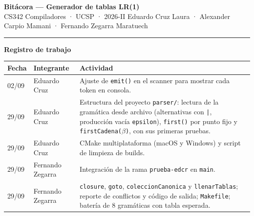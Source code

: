 \documentclass[10pt,a4paper]{article}
\begin{document}
{\Large\textbf{Bitácora --- Generador de tablas LR(1)}}\\[2pt]
CS342 Compiladores · UCSP · 2026-II\hfill
Eduardo Cruz Laura · Alexander Carpio Mamani · Fernando Zegarra Maratuech

\medskip
\hrule
\medskip

\textbf{Registro de trabajo}

\smallskip
{\small
\begin{tabularx}{\linewidth}{@{}l l X@{}}
\toprule
\textbf{Fecha} & \textbf{Integrante} & \textbf{Actividad}\\
\midrule
02/09 & Eduardo Cruz & Ajuste de \texttt{emit()} en el scanner para mostrar cada token en consola.\\
29/09 & Eduardo Cruz & Estructura del proyecto \texttt{parser/}: lectura de la gramática desde archivo (alternativas con \texttt{|}, producción vacía \texttt{epsilon}), \texttt{first()} por punto fijo y \texttt{firstCadena($\beta$)}, con sus primeras pruebas.\\
29/09 & Eduardo Cruz & CMake multiplataforma (macOS y Windows) y script de limpieza de builds.\\
29/09 & Fernando Zegarra & Integración de la rama \texttt{prueba-edcr} en \texttt{main}.\\
29/09 & Fernando Zegarra & \texttt{closure}, \texttt{goto}, \texttt{coleccionCanonica} y \texttt{llenarTablas}; reporte de conflictos y código de salida; \texttt{Makefile}; batería de 8 gramáticas con tabla esperada.\\
\bottomrule
\end{tabularx}
}
\end{document}
